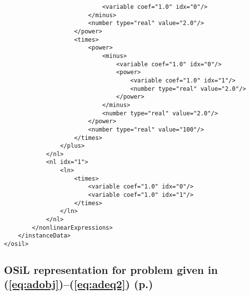 {\begin{verbatim}
                            <variable coef="1.0" idx="0"/>
                        </minus>
                        <number type="real" value="2.0"/>
                    </power>
                    <times>
                        <power>
                            <minus>
                                <variable coef="1.0" idx="0"/>
                                <power>
                                    <variable coef="1.0" idx="1"/>
                                    <number type="real" value="2.0"/>
                                </power>
                            </minus>
                            <number type="real" value="2.0"/>
                        </power>
                        <number type="real" value="100"/>
                    </times>
                </plus>
            </nl>
            <nl idx="1">
                <ln>
                    <times>
                        <variable coef="1.0" idx="0"/>
                        <variable coef="1.0" idx="1"/>
                    </times>
                </ln>
            </nl>
        </nonlinearExpressions>
    </instanceData>
</osil>
\end{verbatim}

}%

\ifruncode\else
\subsection{OSiL representation for problem given in (\ref{eq:adobj})--(\ref{eq:adeq2}) (p.\pageref{eq:adobj})
}\label{section:adexample}

